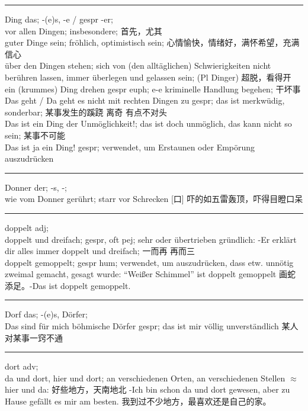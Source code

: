 \noindent\rule{\textwidth}{1pt}
Ding das; -(e)s, -e / gespr -er; \\
vor allen Dingen; insbesondere; 首先，尤其\\
guter Dinge sein; fr\"ohlich, optimistisch sein; 心情愉快，情绪好，满怀希望，充满信心 \\
\"uber den Dingen stehen; sich von (den allt\"aglichen) Schwierigkeiten nicht ber\"uhren lassen, immer \"uberlegen und gelassen sein; (Pl Dinger) 超脱，看得开 \\
ein (krummes) Ding drehen gespr euph; e-e kriminelle Handlung begehen; 干坏事\\
Das geht / Da geht es nicht mit rechten Dingen zu gespr; das ist merkw\"udig, sonderbar; 某事发生的蹊跷 离奇 有点不对头 \\
Das ist ein Ding der Unm\"oglichkeit!; das ist doch unm\"oglich, das kann nicht so sein; 某事不可能 \\
Das ist ja ein Ding! gespr; verwendet, um Erstaunen oder Emp\"orung auszudr\"ucken  \\

\noindent\rule{\textwidth}{1pt}
Donner der; -s, -; \\
wie vom Donner ger\"uhrt; starr vor Schrecken [口] 吓的如五雷轰顶，吓得目瞪口呆\\

\noindent\rule{\textwidth}{1pt}
doppelt adj; \\
doppelt und dreifach; gespr, oft pej; sehr oder \"ubertrieben gr\"undlich: -Er erkl\"art dir alles immer doppelt und dreifach; 一而再 再而三 \\
doppelt gemoppelt; gespr hum; verwendet, um auszudr\"ucken, dass etw. unn\"otig zweimal gemacht, gesagt wurde: ``Wei\ss{}er Schimmel'' ist doppelt gemoppelt 画蛇添足。-Das ist doppelt gemoppelt. \\

\noindent\rule{\textwidth}{1pt}
Dorf das; -(e)s, D\"orfer; \\
Das sind f\"ur mich b\"ohmische D\"orfer gespr; das ist mir v\"ollig unverst\"andlich 某人对某事一窍不通 \\

\noindent\rule{\textwidth}{1pt}
dort adv; \\
da und dort, hier und dort; an verschiedenen Orten, an verschiedenen Stellen $\approx$ hier und da: 好些地方，天南地北 -Ich bin schon da und dort gewesen, aber zu Hause gef\"allt es mir am besten. 我到过不少地方，最喜欢还是自己的家。 \\

